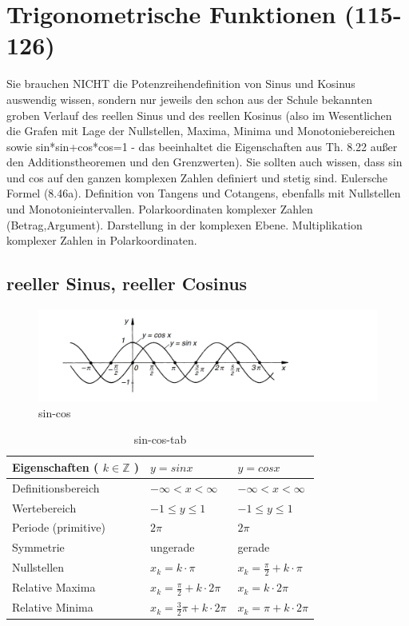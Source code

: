 \section{Trigonometrische Funktionen (115-126)}
 
Sie brauchen NICHT die Potenzreihendefinition von Sinus und Kosinus auswendig wissen, sondern nur jeweils den schon aus der Schule bekannten groben Verlauf des reellen Sinus und des reellen Kosinus (also im Wesentlichen die Grafen mit Lage der Nullstellen, Maxima, Minima und Monotoniebereichen sowie sin*sin+cos*cos=1 - das beeinhaltet die Eigenschaften aus Th. 8.22 außer den Additionstheoremen und den Grenzwerten). Sie sollten auch wissen, dass sin und cos auf den ganzen komplexen Zahlen definiert und stetig sind. Eulersche Formel (8.46a). Definition von Tangens und Cotangens, ebenfalls mit Nullstellen und Monotonieintervallen. Polarkoordinaten komplexer Zahlen (Betrag,Argument). Darstellung in der komplexen Ebene. Multiplikation komplexer Zahlen in Polarkoordinaten. 

\subsection{reeller Sinus, reeller Cosinus}
\begin{figure}[H]
	\centering
  \includegraphics[width=\linewidth]{media/sin-cos.png}
	\caption{sin-cos}
	\label{sin-cos}
\end{figure}

\begin{table}[H]
\begin{tabular}{|l||l|l|}
\hline
Eigenschaften ( $k \in \mathbb { Z }$ )     & $y= sin x$ & $y = cos x$ \\ \hline \hline
Definitionsbereich &     $- \infty < x < \infty$     &    $- \infty < x < \infty$       \\
Wertebereich       &    $ - 1\leq y \leq 1 $    &     $- 1\leq y \leq 1   $   \\ 
Periode (primitive)           &     $ 2\pi $   &    $ 2\pi  $    \\ 
Symmetrie          &     ungerade     &     gerade      \\ 
Nullstellen        &     $x _ { k } = k \cdot \pi$     &     $x _ { k } = \frac { \pi } { 2} + k \cdot \pi$      \\ 
Relative Maxima    &    $x _ { k } = \frac { \pi } { 2} + k \cdot 2\pi$      &      $x _ { k } = k \cdot 2\pi$     \\
Relative Minima    &     $x _ { k } = \frac { 3} { 2} \pi + k \cdot 2\pi$     &    $x _ { k } = \pi + k \cdot 2\pi$       \\ \hline
\end{tabular}
\caption{sin-cos-tab}
\label{sin-cos-tab}
\end{table}

